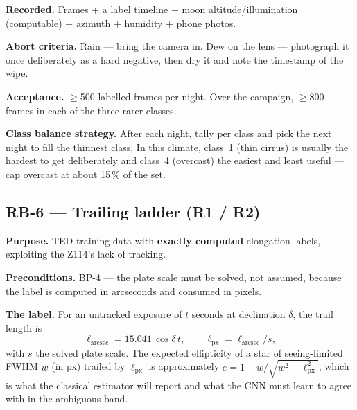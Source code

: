 \documentclass[11pt]{article}
\begin{document}
\textbf{Recorded.} Frames + a label timeline + moon altitude/illumination
(computable) + azimuth + humidity + phone photos.

\textbf{Abort criteria.} Rain --- bring the camera in. Dew on the lens ---
photograph it once deliberately as a hard negative, then dry it and note the
timestamp of the wipe.

\textbf{Acceptance.} $\geq$500 labelled frames per night. Over the campaign,
$\geq$800 frames in each of the three rarer classes.

\textbf{Class balance strategy.} After each night, tally per class and pick the
next night to fill the thinnest class. In this climate, class~1 (thin cirrus) is
usually the hardest to get deliberately and class~4 (overcast) the easiest and
least useful --- cap overcast at about 15\,\% of the set.

\subsection*{RB-6 --- Trailing ladder (R1 / R2)}

\textbf{Purpose.} TED training data with \textbf{exactly computed} elongation
labels, exploiting the Z114's lack of tracking.

\textbf{Preconditions.} BP-4 --- the plate scale must be solved, not assumed,
because the label is computed in arcseconds and consumed in pixels.

\textbf{The label.} For an untracked exposure of $t$ seconds at declination
$\delta$, the trail length is
\[
\ell_{\mathrm{arcsec}} = 15.041 \, \cos\delta \, t ,
\qquad
\ell_{\mathrm{px}} = \ell_{\mathrm{arcsec}} / s ,
\]
with $s$ the solved plate scale. The expected ellipticity of a star of
seeing-limited FWHM $w$ (in px) trailed by $\ell_{\mathrm{px}}$ is
approximately $e = 1 - w/\sqrt{w^2 + \ell_{\mathrm{px}}^2}$, which is what the
classical estimator will report and what the CNN must learn to agree with in
the ambiguous band.
\end{document}
